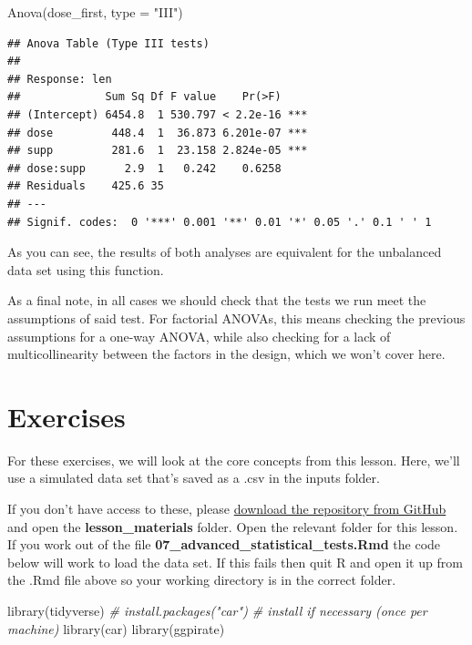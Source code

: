 \documentclass[
]{book}
\newenvironment{Shaded}{\begin{snugshade}}{\end{snugshade}}
\newcommand{\AttributeTok}[1]{\textcolor[rgb]{0.77,0.63,0.00}{#1}}
\newcommand{\CommentTok}[1]{\textcolor[rgb]{0.56,0.35,0.01}{\textit{#1}}}
\newcommand{\FunctionTok}[1]{\textcolor[rgb]{0.00,0.00,0.00}{#1}}
\newcommand{\NormalTok}[1]{#1}
\newcommand{\StringTok}[1]{\textcolor[rgb]{0.31,0.60,0.02}{#1}}
\begin{document}
\begin{Shaded}
\begin{Highlighting}[]
\FunctionTok{Anova}\NormalTok{(dose\_first, }\AttributeTok{type =} \StringTok{"III"}\NormalTok{)}
\end{Highlighting}
\end{Shaded}

\begin{verbatim}
## Anova Table (Type III tests)
## 
## Response: len
##             Sum Sq Df F value    Pr(>F)    
## (Intercept) 6454.8  1 530.797 < 2.2e-16 ***
## dose         448.4  1  36.873 6.201e-07 ***
## supp         281.6  1  23.158 2.824e-05 ***
## dose:supp      2.9  1   0.242    0.6258    
## Residuals    425.6 35                      
## ---
## Signif. codes:  0 '***' 0.001 '**' 0.01 '*' 0.05 '.' 0.1 ' ' 1
\end{verbatim}

As you can see, the results of both analyses are equivalent for the unbalanced data set using this function.

As a final note, in all cases we should check that the tests we run meet the assumptions of said test. For factorial ANOVAs, this means checking the previous assumptions for a one-way ANOVA, while also checking for a lack of multicollinearity between the factors in the design, which we won't cover here.

\hypertarget{exercises-6}{%
\section{Exercises}\label{exercises-6}}

For these exercises, we will look at the core concepts from this lesson. Here, we'll use a simulated data set that's saved as a .csv in the inputs folder.

If you don't have access to these, please \href{https://github.com/gpwilliams/r4psych}{download the repository from GitHub} and open the \textbf{lesson\_materials} folder. Open the relevant folder for this lesson. If you work out of the file \textbf{07\_advanced\_statistical\_tests.Rmd} the code below will work to load the data set. If this fails then quit R and open it up from the .Rmd file above so your working directory is in the correct folder.

\begin{Shaded}
\begin{Highlighting}[]
\FunctionTok{library}\NormalTok{(tidyverse)}
\CommentTok{\# install.packages("car") \# install if necessary (once per machine)}
\FunctionTok{library}\NormalTok{(car)}
\FunctionTok{library}\NormalTok{(ggpirate)}
\end{Highlighting}
\end{Shaded}
\end{document}
